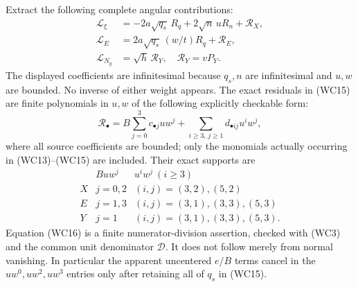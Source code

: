 Extract the following complete angular contributions:
\[
 \begin{aligned}
 \mathcal L_\xi&=-2a\sqrt{q_s}\,R_q+2\sqrt n\,uR_n+\mathcal R_X,\\
 \mathcal L_E&=2a\sqrt{q_s}\,(w/t)R_q+\mathcal R_E,\\
 \mathcal L_{N_y}&=\sqrt h\,\mathcal R_Y,
 \quad \mathcal R_Y=vP_Y.
 \end{aligned}                                                   \tag{WC15}
\]
The displayed coefficients are infinitesimal because $q_s,n$ are
infinitesimal and $u,w$ are bounded. No inverse of either weight
appears. The exact residuals in (WC15) are finite polynomials in
$u,w$ of the following explicitly checkable form:
\[
 \mathcal R_\bullet
 =B\sum_{j=0}^{3}c_{\bullet j}u w^j
   +\sum_{i\ge3,\,j\ge1}d_{\bullet ij}u^iw^j,       \tag{WC16}
\]
where all source coefficients are bounded; only the monomials
actually occurring in (WC13)--(WC15) are included. Their exact
supports are
\[
\begin{array}{c|c|c}
 &Buw^j&u^iw^j\ (i\ge3)\\ \hline
 X&j=0,2&(i,j)=(3,2),(5,2)\\
 E&j=1,3&(i,j)=(3,1),(3,3),(5,3)\\
 Y&j=1&(i,j)=(3,1),(3,3),(5,3).
\end{array}                                                    \tag{WC17}
\]
Equation (WC16) is a finite numerator-division assertion, checked
with (WC3) and the common unit denominator $\mathcal D$. It does
not follow merely from normal vanishing. In particular the apparent
uncentered $e/B$ terms cancel in the $u w^0,u w^2,u w^3$ entries
only after retaining all of $q_s$ in (WC15).

